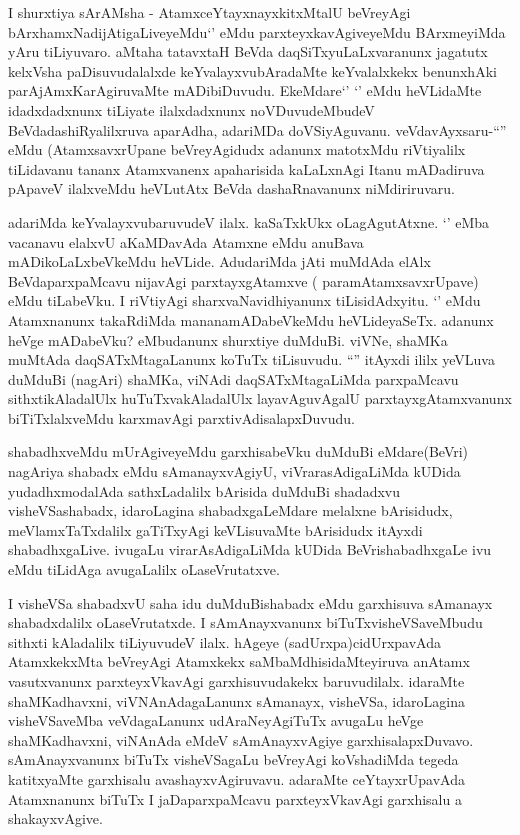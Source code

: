 \begin{artha}
I shurxtiya sArAMsha - AtamxceYtayxnayxkitxMtalU beVreyAgi
bArxhamxNadijAtigaLiveyeMdu`\stext' eMdu parxteyxkavAgiveyeMdu
BArxmeyiMda yAru tiLiyuvaro. aMtaha tatavxtaH BeVda
daqSiTxyuLaLxvaranunx jagatutx kelxVsha paDisuvudalalxde
keYvalayxvubAradaMte keYvalalxkekx benunxhAki parAjAmxKarAgiruvaMte
mADibiDuvudu. EkeMdare`\stext' `\stext' eMdu heVLidaMte idadxdadxnunx
tiLiyate ilalxdadxnunx noVDuvudeMbudeV BeVdadashiRyalilxruva aparAdha,
adariMDa doVSiyAguvanu. veVdavAyxsaru-``\stext'' eMdu (AtamxsavxrUpane
beVreyAgidudx adanunx matotxMdu riVtiyalilx tiLidavanu tananx
Atamxvanenx apaharisida kaLaLxnAgi Itanu mADadiruva pApaveV ilalxveMdu
heVLutAtx BeVda dashaRnavanunx niMdiriruvaru.

adariMda keYvalayxvubaruvudeV ilalx. kaSaTxkUkx
oLagAgutAtxne. `\stext' eMba vacanavu elalxvU aKaMDavAda Atamxne eMdu
anuBava mADikoLaLxbeVkeMdu heVLide. AdudariMda jAti muMdAda elAlx
BeVdaparxpaMcavu nijavAgi parxtayxgAtamxve ( paramAtamxsavxrUpave)
eMdu tiLabeVku. I riVtiyAgi sharxvaNavidhiyanunx
tiLisidAdxyitu. `\stext' eMdu Atamxnanunx takaRdiMda
mananamADabeVkeMdu heVLideyaSeTx. adanunx heVge mADabeVku? eMbudanunx
shurxtiye duMduBi. viVNe, shaMKa muMtAda daqSATxMtagaLanunx koTuTx
tiLisuvudu.
``\stext'' itAyxdi ililx yeVLuva duMduBi (nagAri) shaMKa, viNAdi
daqSATxMtagaLiMda parxpaMcavu sithxtikAladalUlx huTuTxvakAladalUlx
layavAguvAgalU parxtayxgAtamxvanunx biTiTxlalxveMdu karxmavAgi
parxtivAdisalapxDuvudu. 

shabadhxveMdu mUrAgiveyeMdu garxhisabeVku duMduBi eMdare(BeVri)
nagAriya shabadx eMdu sAmanayxvAgiyU, viVrarasAdigaLiMda kUDida
yudadhxmodalAda sathxLadalilx bArisida duMduBi shadadxvu
visheVSashabadx, idaroLagina shabadxgaLeMdare melalxne bArisidudx,
meVlamxTaTxdalilx gaTiTxyAgi keVLisuvaMte bArisidudx itAyxdi
shabadhxgaLive. ivugaLu virarAsAdigaLiMda kUDida BeVrishabadhxgaLe ivu
eMdu tiLidAga avugaLalilx oLaseVrutatxve.

I visheVSa shabadxvU saha idu duMduBishabadx eMdu garxhisuva sAmanayx
shabadxdalilx oLaseVrutatxde. I sAmAnayxvanunx biTuTxvisheVSaveMbudu
sithxti kAladalilx tiLiyuvudeV ilalx. hAgeye (sadUrxpa)cidUrxpavAda
AtamxkekxMta beVreyAgi Atamxkekx saMbaMdhisidaMteyiruva anAtamx
vasutxvanunx parxteyxVkavAgi garxhisuvudakekx baruvudilalx. idaraMte
shaMKadhavxni, viVNAnAdagaLanunx sAmanayx, visheVSa, idaroLagina
visheVSaveMba veVdagaLanunx udAraNeyAgiTuTx avugaLu heVge
shaMKadhavxni, viNAnAda eMdeV sAmAnayxvAgiye
garxhisalapxDuvavo. sAmAnayxvanunx biTuTx visheVSagaLu beVreyAgi
koVshadiMda tegeda katitxyaMte garxhisalu avashayxvAgiruvavu. adaraMte
ceYtayxrUpavAda Atamxnanunx biTuTx I jaDaparxpaMcavu parxteyxVkavAgi
garxhisalu a shakayxvAgive.


\end{artha}
